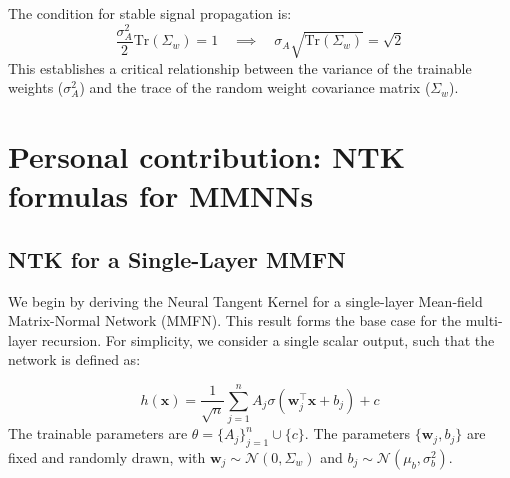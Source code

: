 \documentclass[a4paper]{article}
\theoremstyle{plain}
\theoremstyle{definition}
\theoremstyle{remark}
\begin{document}
\begin{tcolorbox}[colback=red!15,colframe=red!80!black,title={\textbf{Edge of Chaos Condition}},enhanced,drop shadow,boxrule=2pt]

The condition for stable signal propagation is:
\begin{equation}
    \frac{\sigma_A^2}{2} \text{Tr}(\Sigma_w) = 1 \quad \implies \quad \sigma_A \sqrt{\text{Tr}(\Sigma_w)} = \sqrt{2}
\end{equation}
This establishes a critical relationship between the variance of the trainable weights ($\sigma_A^2$) and the trace of the random weight covariance matrix ($\Sigma_w$).
\end{tcolorbox}














\section{Personal contribution: NTK formulas for MMNNs}

\subsection{NTK for a Single-Layer MMFN}
\label{sec:single_layer_mmfn}
We begin by deriving the Neural Tangent Kernel for a single-layer Mean-field Matrix-Normal Network (MMFN). This result forms the base case for the multi-layer recursion. For simplicity, we consider a single scalar output, such that the network is defined as:

\begin{tcolorbox}[colback=blue!10,colframe=blue!80!black,title={\textbf{Single-Layer MMFN Definition}},enhanced,drop shadow,boxrule=2pt]
\begin{equation}
    \boxed{h(\bm{x}) = \frac{1}{\sqrt{n}} \sum_{j=1}^n A_j \sigma(\bm{w}_j^\top \bm{x} + b_j) + c}
\end{equation}
The trainable parameters are $\theta = \{A_j\}_{j=1}^n \cup \{c\}$. The parameters $\{\bm{w}_j, b_j\}$ are fixed and randomly drawn, with $\bm{w}_j \sim \mathcal{N}(0, \Sigma_w)$ and $b_j \sim \mathcal{N}(\mu_b, \sigma_b^2)$.
\end{tcolorbox}
\end{document}
